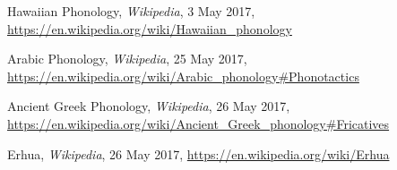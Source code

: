 \documentclass[11pt,letterpaper]{article}
\begin{document}
\pagebreak
\begin{thebibliography}{99}
	 Hawaiian Phonology, \textit{Wikipedia}, 3 May 2017,
    \url{https://en.wikipedia.org/wiki/Hawaiian_phonology}
    
     Arabic Phonology, \textit{Wikipedia}, 25 May 2017,
    \url{https://en.wikipedia.org/wiki/Arabic_phonology#Phonotactics}
    
     Ancient Greek Phonology, \textit{Wikipedia}, 26 May 2017,
    \url{https://en.wikipedia.org/wiki/Ancient_Greek_phonology#Fricatives}

	 Erhua, \textit{Wikipedia}, 26 May 2017,
	\url{https://en.wikipedia.org/wiki/Erhua}
\end{thebibliography}
\end{document}
